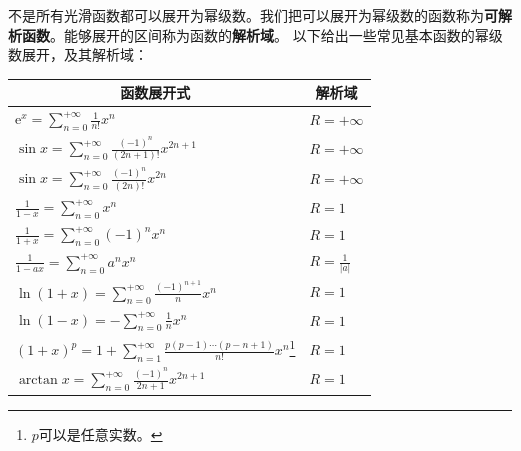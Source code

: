 \documentclass[12pt,UTF8]{ctexbook}
\theoremstyle{definition}
\theoremstyle{plain}
\begin{document}
不是所有光滑函数都可以展开为幂级数。我们把可以展开为幂级数的函数称为\textbf{可解析函数}。能够展开的区间称为函数的\textbf{解析域}。
以下给出一些常见基本函数的幂级数展开，及其解析域：


\begin{center}
    \renewcommand{\arraystretch}{2}
    \setlength{\extrarowheight}{-3pt}
    \begin{longtable}{|l|l|}
        \hline \multicolumn{1}{|c|}{\textbf{函数展开式}} & \multicolumn{1}{c|}{\textbf{解析域}} \\ 
        \hline         
        $\mathrm{e}^x = \displaystyle  \sum_{n=0}^{+\infty} \frac{1}{n!} x^n $ & $R=+\infty$ \\  
        \hline
        $\sin{x} = \displaystyle  \sum_{n=0}^{+\infty} \frac{(-1)^n}{(2n+1)!} x^{2n+1} $ & $R=+\infty$ \\ 
        \hline
        $\sin{x} = \displaystyle  \sum_{n=0}^{+\infty} \frac{(-1)^n}{(2n)!} x^{2n} $ & $R=+\infty$ \\
        \hline
        $\displaystyle \frac{1}{1 - x} = \sum_{n=0}^{+\infty} x^n $ & $R = 1$ \\
        \hline
        $\displaystyle \frac{1}{1 + x} = \displaystyle  \sum_{n=0}^{+\infty} (-1)^n x^n $ & $R = 1$ \\
        \hline
        $\displaystyle \frac{1}{1 - ax} = \displaystyle  \sum_{n=0}^{+\infty} a^n x^n $ & $R = \frac{1}{|a|}$ \\
        \hline
        $\ln{(1 + x)} = \displaystyle  \sum_{n=0}^{+\infty} \frac{(-1)^{n+1}}{n} x^n $ & $R = 1$ \\
        \hline
        $\ln{(1 - x)} = \displaystyle  -\sum_{n=0}^{+\infty} \frac{1}{n} x^n $ & $R = 1$ \\
        \hline
        $(1 + x)^p = \displaystyle 1 + \sum_{n=1}^{+\infty} \frac{p(p - 1)\cdots(p - n + 1)}{n!} x^n $\footnote{$p$可以是任意实数。} & $R = 1$ \\
        \hline
        $\arctan{x} = \displaystyle  \sum_{n=0}^{+\infty} \frac{(-1)^n}{2n + 1} x^{2n+1} $ & $R=1$ \\
        \hline
    \end{longtable}
\end{center}
\end{document}
